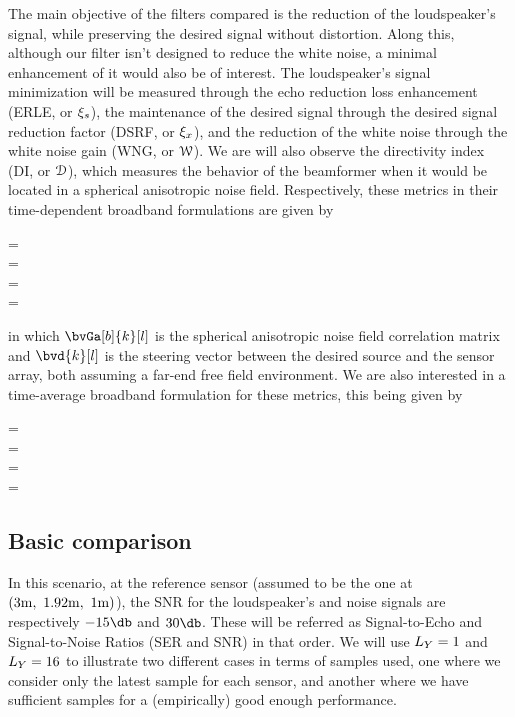 The main objective of the filters compared is the reduction of the loudspeaker's signal, while preserving the desired signal without distortion. Along this, although our filter isn't designed to reduce the white noise, a minimal enhancement of it would also be of interest. The loudspeaker's signal minimization will be measured through the echo reduction loss enhancement (ERLE, or $\xi_{s}$), the maintenance of the desired signal through the desired signal reduction factor (DSRF, or $\xi_{x}$), and the reduction of the white noise through the white noise gain (WNG, or $\mathcal{W}$). We are will also observe the directivity index (DI, or $\mathcal{D}$), which measures the behavior of the beamformer when it would be located in a spherical anisotropic noise field. Respectively, these metrics in their time-dependent broadband formulations are given by
\begin{subgather}
	\dsrf[l] =  \\
	\erle[l] =  \\
	\wng[l] =  \\
	\di[l] = 
\end{subgather}
in which $\bvGa[b]{k}[l]$ is the spherical anisotropic noise field correlation matrix \cite{habets_generating_2007} and $\bvd{k}[l]$ is the steering vector between the desired source and the sensor array, both assuming a far-end free field environment. We are also interested in a time-average broadband formulation for these metrics, this being given by
\begin{subgather}
	\dsrf =  \\
	\erle =  \\
	\wng =  \\
	\di = 
\end{subgather}

\subsection{Basic comparison}
In this scenario, at the reference sensor (assumed to be the one at $(3\si{\meter},~1.92\si{\meter},~1\si{\meter})$), the SNR for the loudspeaker's and noise signals are respectively $-15\dB$ and $30\dB$. These will be referred as Signal-to-Echo and Signal-to-Noise Ratios (SER and SNR) in that order. We will use $\Ly = 1$ and $\Ly = 16$ to illustrate two different cases in terms of samples used, one where we consider only the latest sample for each sensor, and another where we have sufficient samples for a (empirically) good enough performance.

